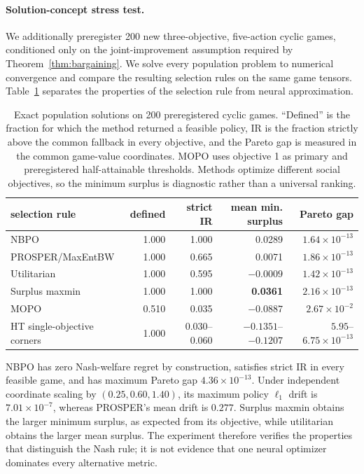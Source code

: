 \documentclass{article}
\theoremstyle{remark}
\theoremstyle{plain}
\newcommand{\NBPO}{\textsc{NBPO}}
\begin{document}
\paragraph{Solution-concept stress test.}
We additionally preregister 200 new three-objective, five-action cyclic games, conditioned only on the joint-improvement assumption required by Theorem~\ref{thm:bargaining}.  We solve every population problem to numerical convergence and compare the resulting selection rules on the same game tensors.  Table~\ref{tab:synthetic-solution-concepts} separates the properties of the selection rule from neural approximation.

\begin{table}[t]
\centering\footnotesize
\setlength{\tabcolsep}{3.5pt}
\caption{Exact population solutions on 200 preregistered cyclic games. ``Defined'' is the fraction for which the method returned a feasible policy, IR is the fraction strictly above the common fallback in every objective, and the Pareto gap is measured in the common game-value coordinates.  MOPO uses objective 1 as primary and preregistered half-attainable thresholds.  Methods optimize different social objectives, so the minimum surplus is diagnostic rather than a universal ranking.}
\label{tab:synthetic-solution-concepts}
\begin{tabular}{lrrrr}
\toprule
selection rule & defined & strict IR & mean min. surplus & Pareto gap \\
\midrule
\NBPO{} & 1.000 & 1.000 & 0.0289 & $1.64\!\times\!10^{-13}$ \\
PROSPER/MaxEntBW & 1.000 & 0.665 & 0.0071 & $1.86\!\times\!10^{-13}$ \\
Utilitarian & 1.000 & 0.595 & $-0.0009$ & $1.42\!\times\!10^{-13}$ \\
Surplus maxmin & 1.000 & 1.000 & \textbf{0.0361} & $2.16\!\times\!10^{-13}$ \\
MOPO & 0.510 & 0.035 & $-0.0887$ & $2.67\!\times\!10^{-2}$ \\
HT single-objective corners & 1.000 & 0.030--0.060 & $-0.1351$--$-0.1207$ & $5.95$--$6.75\!\times\!10^{-13}$ \\
\bottomrule
\end{tabular}
\end{table}

\NBPO{} has zero Nash-welfare regret by construction, satisfies strict IR in every feasible game, and has maximum Pareto gap $4.36\times10^{-13}$.  Under independent coordinate scaling by $(0.25,0.60,1.40)$, its maximum policy $\ell_1$ drift is $7.01\times10^{-7}$, whereas PROSPER's mean drift is $0.277$.  Surplus maxmin obtains the larger minimum surplus, as expected from its objective, while utilitarian obtains the larger mean surplus.  The experiment therefore verifies the properties that distinguish the Nash rule; it is not evidence that one neural optimizer dominates every alternative metric.
\end{document}
